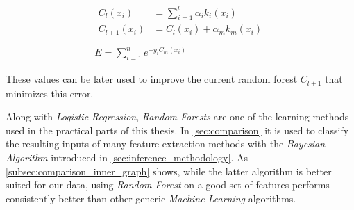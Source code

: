 \begin{equation}
	\begin{gathered}
		\begin{aligned}
			C_l \left( x_i \right) &= \sum^l_{i = 1} \alpha_i k_i \left( x_i \right) \\
			C_{l + 1} \left( x_i \right) &= C_l \left( x_i \right) + \alpha_m k_m \left( x_i \right) \\
		\end{aligned} \\
		E = \sum^n_{i = 1} e^{-y_i C_m \left( x_i \right)}
	\end{gathered}
\end{equation}

These values can be later used to improve the current random forest $C_{l + 1}$ that minimizes this error.

Along with \emph{Logistic Regression}, \emph{Random Forests} are one of the learning methods used in the practical parts of this thesis.
In \cref{sec:comparison} it is used to classify the resulting inputs of many feature extraction methods with the \emph{Bayesian Algorithm} introduced in \cref{sec:inference_methodology}. As \cref{subsec:comparison_inner_graph} shows, while the latter algorithm is better suited for our data, using \emph{Random Forest} on a good set of features performs consistently better than other generic \emph{Machine Learning} algorithms.
